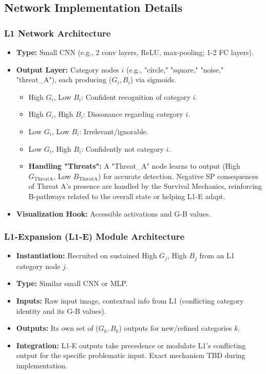 \documentclass{article}
\begin{document}
\subsection{Network Implementation Details}

\subsubsection{L1 Network Architecture}
\begin{itemize}
    \item \textbf{Type:} Small CNN (e.g., 2 conv layers, ReLU, max-pooling; 1-2 FC layers).
    \item \textbf{Output Layer:} Category nodes $i$ (e.g., "circle," "square," "noise," "threat\_A"), each producing ($G_i, B_i$) via sigmoids.
    \begin{itemize}
        \item High $G_i$, Low $B_i$: Confident recognition of category $i$.
        \item High $G_i$, High $B_i$: Dissonance regarding category $i$.
        \item Low $G_i$, Low $B_i$: Irrelevant/ignorable.
        \item Low $G_i$, High $B_i$: Confidently not category $i$.
        \item \textbf{Handling "Threats":} A "Threat\_A" node learns to output (High $G_{\text{ThreatA}}$, Low $B_{\text{ThreatA}}$) for accurate detection. Negative SP consequences of Threat A's presence are handled by the Survival Mechanics, reinforcing B-pathways related to the overall state or helping L1-E adapt.
    \end{itemize}
    \item \textbf{Visualization Hook:} Accessible activations and G-B values.
\end{itemize}

\subsubsection{L1-Expansion (L1-E) Module Architecture}
\begin{itemize}
    \item \textbf{Instantiation:} Recruited on sustained High $G_j$, High $B_j$ from an L1 category node $j$.
    \item \textbf{Type:} Similar small CNN or MLP.
    \item \textbf{Inputs:} Raw input image, contextual info from L1 (conflicting category identity and its G-B values).
    \item \textbf{Outputs:} Its own set of ($G_k, B_k$) outputs for new/refined categories $k$.
    \item \textbf{Integration:} L1-E outputs take precedence or modulate L1's conflicting output for the specific problematic input. Exact mechanism TBD during implementation.
\end{itemize}
\end{document}
